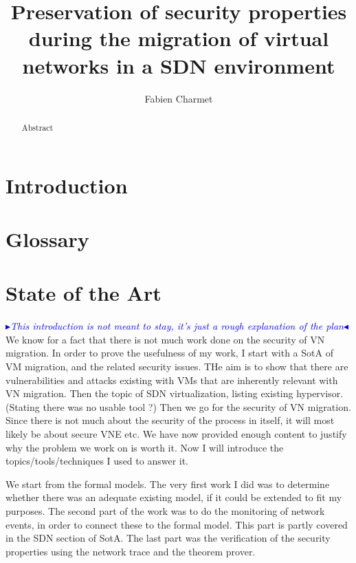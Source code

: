 \documentclass[a4paper, 11pt]{article}
\title{\LARGE \bf Preservation of security properties during the migration of virtual networks in a SDN environment}
\author{Fabien Charmet}
\newcommand{\boxedtext}[1]{\fbox{\scriptsize\bfseries\textsf{#1}}}
\newcommand{\myremark}[2]{
   \textcolor{blue}{\boxedtext{#1}
      {\small$\blacktriangleright$\emph{\textsl{#2}}$\blacktriangleleft$}
}}
\newcommand\FC[1]{\myremark{FC}{#1}}
\begin{document}
\maketitle

\begin{abstract}
Abstract
\end{abstract}

\tableofcontents
\listoffigures
 \listoftables
\thispagestyle{empty}

\newpage
\section{Introduction}

 
\section{Glossary}



\newpage
\section{State of the Art}
\FC{This introduction is not meant to stay, it's just a rough explanation of the plan}
We know for a fact that there is not much work done on the security of VN migration.
In order to prove the usefulness of my work, I start with a SotA of VM migration, and the related security issues.
THe aim is to show that there are vulnerabilities and attacks existing with VMs that are inherently relevant with VN migration.
Then the topic of SDN virtualization, listing existing hypervisor. (Stating there was no usable tool ?)
Then we go for the security of VN migration. Since there is not much about the security of the process in itself, it will most likely be about secure VNE etc.
We have now provided enough content to justify why the problem we work on is worth it.
Now I will introduce the topics/tools/techniques I used to answer it.

We start from the formal models. The very first work I did was to determine whether there was an adequate existing model, if it could be extended to fit my purposes. 
The second part of the work was to do the monitoring of network events, in order to connect these to the formal model. This part is partly covered in the SDN section of SotA.
The last part was the verification of the security properties using the network trace and the theorem prover.
\end{document}
